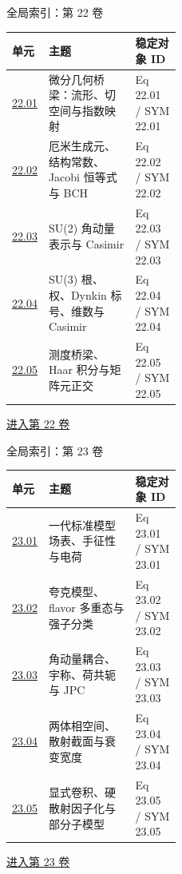 \documentclass[aspectratio=169,10pt]{ctexbeamer}
\begin{document}
\begin{frame}[t]{全局索引：第 22 卷}
\small\begin{tabularx}{\linewidth}{p{0.15\linewidth}Yp{0.27\linewidth}}
\toprule 单元 & 主题 & 稳定对象 ID\\\midrule
\hyperlink{Fr:22.01-1}{22.01} & 微分几何桥梁：流形、切空间与指数映射 & Eq 22.01 / SYM 22.01\\
\hyperlink{Fr:22.02-1}{22.02} & 厄米生成元、结构常数、Jacobi 恒等式与 BCH & Eq 22.02 / SYM 22.02\\
\hyperlink{Fr:22.03-1}{22.03} & SU(2) 角动量表示与 Casimir & Eq 22.03 / SYM 22.03\\
\hyperlink{Fr:22.04-1}{22.04} & SU(3) 根、权、Dynkin 标号、维数与 Casimir & Eq 22.04 / SYM 22.04\\
\hyperlink{Fr:22.05-1}{22.05} & 测度桥梁、Haar 积分与矩阵元正交 & Eq 22.05 / SYM 22.05\\
\bottomrule\end{tabularx}
\vfill\hyperlink{Fr:V22-title}{进入第 22 卷}
\end{frame}

\begin{frame}[t]{全局索引：第 23 卷}
\small\begin{tabularx}{\linewidth}{p{0.15\linewidth}Yp{0.27\linewidth}}
\toprule 单元 & 主题 & 稳定对象 ID\\\midrule
\hyperlink{Fr:23.01-1}{23.01} & 一代标准模型场表、手征性与电荷 & Eq 23.01 / SYM 23.01\\
\hyperlink{Fr:23.02-1}{23.02} & 夸克模型、flavor 多重态与强子分类 & Eq 23.02 / SYM 23.02\\
\hyperlink{Fr:23.03-1}{23.03} & 角动量耦合、宇称、荷共轭与 JPC & Eq 23.03 / SYM 23.03\\
\hyperlink{Fr:23.04-1}{23.04} & 两体相空间、散射截面与衰变宽度 & Eq 23.04 / SYM 23.04\\
\hyperlink{Fr:23.05-1}{23.05} & 显式卷积、硬散射因子化与部分子模型 & Eq 23.05 / SYM 23.05\\
\bottomrule\end{tabularx}
\vfill\hyperlink{Fr:V23-title}{进入第 23 卷}
\end{frame}
\end{document}
